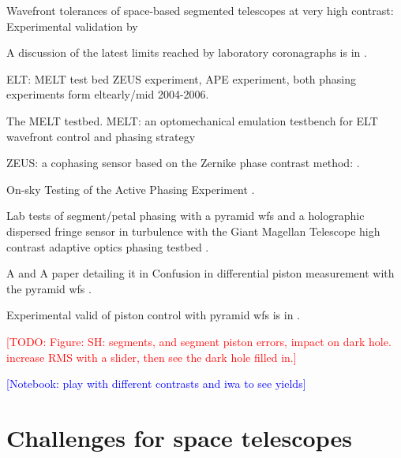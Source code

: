 \documentclass[letterpaper]{ar-1col}
\newcommand{\notebooksuggestion}[1]{\textcolor{blue}{[Notebook: #1]}}
\newcommand{\todo}[1]{\textcolor{red}{[TODO: #1]}}
\begin{document}

Wavefront tolerances of space-based segmented telescopes at very high contrast: Experimental validation by \citet{Laginja22}

A discussion of the latest limits reached by laboratory coronagraphs is in \citet{Mennesson24}.

ELT: MELT test bed ZEUS experiment, APE experiment, both phasing experiments form \ac{elt}early/mid 2004-2006.

The MELT testbed. MELT: an optomechanical emulation testbench for ELT wavefront control and phasing strategy \citep{Pfrommer18}

ZEUS: a cophasing sensor based on the Zernike phase contrast method: \citep{Dohlen06}.

On-sky Testing of the Active Phasing Experiment  \citet{Gonte09}.


Lab tests of segment/petal phasing with a pyramid \ac{wfs} and a holographic dispersed fringe sensor in turbulence with the Giant Magellan Telescope high contrast adaptive optics phasing testbed \citep{Hedglen22}.

A and A paper detailing it in Confusion in differential piston measurement with the pyramid \ac{wfs} \citep{Bertrou-Cantou22}.

Experimental valid of piston control with pyramid \ac{wfs} is in \citet{Bertrou-Cantou23}. 


\todo{Figure: SH: segments, and segment piston errors, impact on dark hole. increase RMS with a slider, then see the dark hole filled in.}


\notebooksuggestion{play with different contrasts and \ac{iwa} to see yields}

\section{Challenges for space telescopes}
\end{document}
